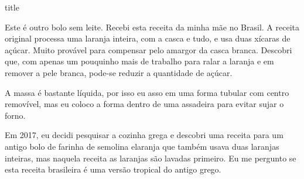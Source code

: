 \documentclass [11pt, letterpaper] {article}
\begin{document}
 {title}

Este é outro bolo sem leite. Recebi esta receita da minha mãe no
Brasil. A receita original processa uma laranja inteira, com a casca e
tudo, e usa duas xícaras de açúcar. Muito provável para compensar pelo
amargor da casca branca. Descobri que, com apenas um pouquinho mais de
trabalho para ralar a laranja e em remover a pele branca, pode-se reduzir a quantidade de açúcar.

A massa é bastante líquida, por isso eu asso em uma forma tubular com
centro removível, mas eu coloco a forma dentro de uma assadeira para evitar sujar o forno.

Em 2017, eu decidi pesquisar a cozinha grega e descobri uma receita
para um antigo bolo de farinha de semolina elaranja que também usava
duas laranjas inteiras, mas naquela receita as laranjas s\~ao lavadas primeiro. Eu me pergunto se esta receita brasileira é uma versão tropical do antigo grego.
\end{document}
